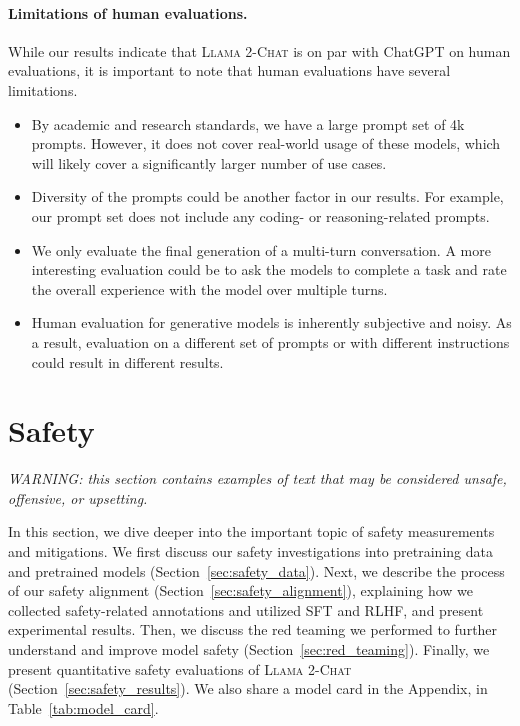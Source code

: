 \paragraph{Limitations of human evaluations.}

While our results indicate that \textsc{Llama 2-Chat} is on par with ChatGPT on human evaluations, it is important to note that human evaluations have several limitations.

\begin{itemize}[leftmargin=*]
    \item By academic and research standards, we have a large prompt set of 4k prompts. However, it does not cover real-world usage of these models, which will likely cover a significantly larger number of use cases.
    \item Diversity of the prompts could be another factor in our results. For example, our prompt set does not include any coding- or reasoning-related prompts.
    \item We only evaluate the final generation of a multi-turn conversation. A more interesting evaluation could be to ask the models to complete a task and rate the overall experience with the model over multiple turns.
    \item Human evaluation for generative models is inherently subjective and noisy. As a result, evaluation on a different set of prompts or with different instructions could result in different results. 
\end{itemize}

\section{Safety}
\label{sec:safety_section}

{\color{olive}\textit{WARNING: this section contains examples of text that may be considered unsafe, offensive, or upsetting.}}

In this section, we dive deeper into the important topic of safety measurements and mitigations. We first discuss our safety investigations into pretraining data and pretrained models (Section~\ref{sec:safety_data}).
Next, we describe the process of our safety alignment (Section~\ref{sec:safety_alignment}), explaining how we collected safety-related annotations and utilized SFT and RLHF, and present experimental results. Then, we discuss the red teaming we performed to further understand and improve model safety (Section~\ref{sec:red_teaming}). 
Finally, we present quantitative safety evaluations of \textsc{Llama 2-Chat} (Section~\ref{sec:safety_results}). We also share a model card in the Appendix, in Table~\ref{tab:model_card}.

